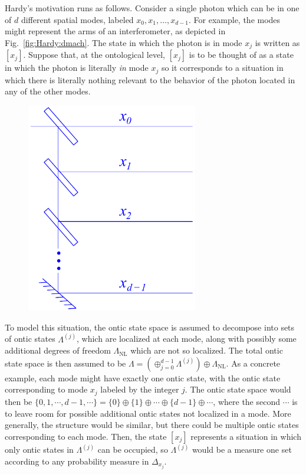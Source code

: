 \documentclass[DIV=calc,fontsize=12pt]{scrartcl} %
\theoremstyle{definition}
\theoremstyle{plain}
\newcommand{\Proj}[1]{\ensuremath{\left [ #1 \right ]}}
\begin{document}
Hardy's motivation runs as follows.  Consider a single photon which
can be in one of $d$ different spatial modes, labeled $x_0, x_1,
\ldots, x_{d-1}$.  For example, the modes might represent the arms of
an interferometer, as depicted in Fig.~\ref{fig:Hardy:dmach}. The
state in which the photon is in mode $x_j$ is written as $\Proj{x_j}$.
Suppose that, at the ontological level, $\Proj{x_j}$ is to be thought
of as a state in which the photon is literally \emph{in} mode $x_j$ so
it corresponds to a situation in which there is literally nothing
relevant to the behavior of the photon located in any of the other
modes.
\begin{figure}[t!]
\centering
\includegraphics[width=75mm]{Fig12.pdf}
\caption{}
\end{figure}
To model this situation, the ontic state space is assumed to decompose
into sets of ontic states $\Lambda^{(j)}$, which are localized at each
mode, along with possibly some additional degrees of freedom
$\Lambda_{\text{NL}}$ which are not so localized.  The total ontic
state space is then assumed to be $\Lambda = \left (
\oplus_{j=0}^{d-1} \Lambda^{(j)} \right ) \oplus
\Lambda_{\text{NL}}$.  As a concrete example, each mode might have
exactly one ontic state, with the ontic state corresponding to mode
$x_j$ labeled by the integer $j$.  The ontic state space would then
be $\{0, 1, \cdots,d-1, \cdots\} = \{0\} \oplus \{1\} \oplus \cdots
\oplus \{d-1\} \oplus \cdots$, where the second $\cdots$ is to leave
room for possible additional ontic states not localized in a mode.
More generally, the structure would be similar, but there could be
multiple ontic states corresponding to each mode.  Then, the state
$\Proj{x_j}$ represents a situation in which only ontic states in
$\Lambda^{(j)}$ can be occupied, so $\Lambda^{(j)}$ would be a measure
one set according to any probability measure in $\Delta_{x_j}$.
\end{document}
